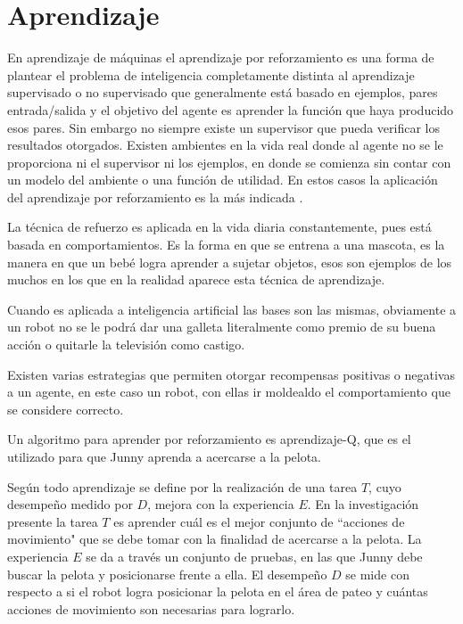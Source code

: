 
\section{Aprendizaje}\label{aprendizaje}

En aprendizaje de m\'aquinas el aprendizaje por reforzamiento es una forma de plantear el problema de inteligencia completamente distinta al aprendizaje supervisado o no supervisado que generalmente está basado en ejemplos, pares entrada/salida y el objetivo del agente es aprender la funci\'on que haya producido esos pares. Sin embargo no siempre existe un supervisor que pueda verificar los resultados otorgados.
Existen ambientes en la vida real donde al agente no se le proporciona ni el supervisor ni los ejemplos, en donde se comienza sin contar con un modelo del ambiente o una funci\'on de utilidad. En estos casos la aplicaci\'on del aprendizaje por reforzamiento es la más indicada \cite{peterAndNorvig}.

La t\'ecnica de refuerzo es aplicada en la vida diaria constantemente, pues está basada en comportamientos. Es la forma en que se entrena a una mascota, es la manera en que un bebé logra aprender a sujetar objetos, esos son ejemplos de los muchos en los que en la realidad aparece esta t\'ecnica de aprendizaje.

Cuando es aplicada a inteligencia artificial las bases son las mismas, obviamente a un robot no se le podr\'a dar una galleta literalmente como premio de su buena acci\'on o quitarle la televisi\'on como castigo.
 
Existen varias estrategias que permiten otorgar recompensas positivas o negativas a un agente, en este caso un robot, con ellas ir moldealdo el comportamiento que se considere correcto.

Un algoritmo para aprender por reforzamiento es aprendizaje-Q, que es el utilizado para que Junny aprenda a acercarse a la pelota.
 


Según \cite{Mitchell} todo aprendizaje se define por la realización de una tarea $T$, cuyo desempeño medido por $D$, mejora con la experiencia $E$. En la investigación presente la tarea $T$ es aprender cuál es el mejor conjunto de ``acciones de movimiento" que se debe tomar con la finalidad de acercarse a la pelota. La experiencia $E$ se da a través un conjunto de pruebas, en las que Junny debe buscar la pelota y posicionarse frente a ella. El desempeño $D$ se mide con respecto a si el robot logra posicionar la pelota en el área de pateo y cuántas acciones de movimiento son necesarias para lograrlo.

